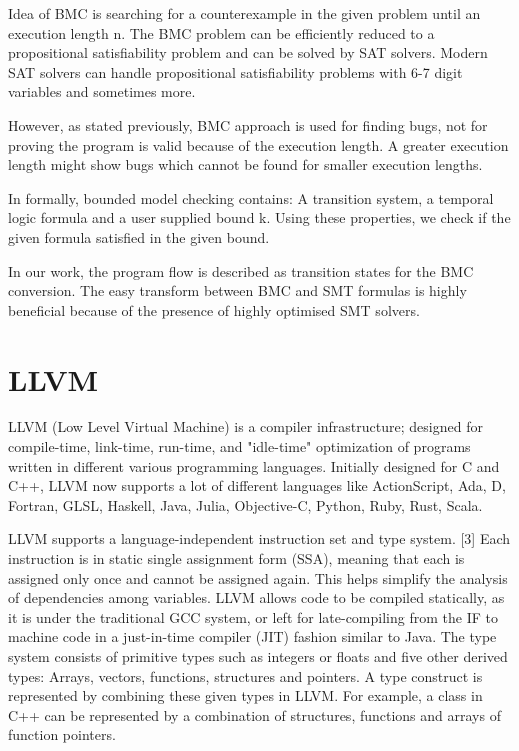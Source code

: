 \documentclass[14pt]{article}
\begin{document}
Idea of BMC is searching for a counterexample in the given problem until an execution length n. The BMC problem can be efficiently reduced to a propositional satisfiability problem and can be solved by SAT solvers. Modern SAT solvers can handle propositional satisfiability problems with 6-7 digit variables and sometimes more.
					
However, as stated previously, BMC approach is used for finding bugs, not for proving the program is valid because of the execution length. A greater execution length might show bugs which cannot be found for smaller execution lengths.
					
In formally, bounded model checking contains: A transition system, a temporal logic formula and a user supplied bound k. Using these properties, we check if the given formula satisfied in the given bound.
					
In our work, the program flow is described as transition states for the BMC conversion. The easy transform between BMC and SMT formulas is highly beneficial because of the presence of highly optimised SMT solvers.

\section{LLVM}\label{llvm}
LLVM (Low Level Virtual Machine) is a compiler infrastructure; designed for compile-time, link-time, run-time, and "idle-time" optimization of programs written in different various programming languages. Initially designed for C and C++, LLVM now supports a lot of different languages like ActionScript, Ada, D, Fortran, GLSL, Haskell, Java, Julia, Objective-C, Python, Ruby, Rust, Scala.
					
LLVM supports a language-independent instruction set and type system. [3] Each instruction is in static single assignment form (SSA), meaning that each is assigned only once and cannot be assigned again. This helps simplify the analysis of dependencies among variables. LLVM allows code to be compiled statically, as it is under the traditional GCC system, or left for late-compiling from the IF to machine code in a just-in-time compiler (JIT) fashion similar to Java. The type system consists of primitive types such as integers or floats and five other derived types: Arrays, vectors, functions, structures and pointers. A type construct is represented by combining these given types in LLVM. For example, a class in C++ can be represented by a combination of structures, functions and arrays of function pointers.
					
\end{document}
